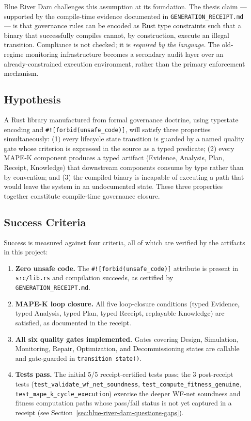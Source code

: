 Blue River Dam challenges this assumption at its foundation. The thesis
claim --- supported by the compile-time evidence documented in
\texttt{GENERATION\_RECEIPT.md} --- is that governance rules can be
encoded as Rust type constraints such that a binary that successfully compiles
cannot, by construction, execute an illegal transition. Compliance is not
checked; it is \emph{required by the language}. The old-regime monitoring
infrastructure becomes a secondary audit layer over an already-constrained
execution environment, rather than the primary enforcement mechanism.

\subsection{Hypothesis}
\label{sec:blue-river-dam-question-hypothesis}

A Rust library manufactured from formal governance doctrine, using typestate
encoding and \texttt{\#![forbid(unsafe\_code)]}, will satisfy three
properties simultaneously: (1) every lifecycle state transition is guarded
by a named quality gate whose criterion is expressed in the source as a
typed predicate; (2) every MAPE-K component produces a typed artifact
(Evidence, Analysis, Plan, Receipt, Knowledge) that downstream components
consume by type rather than by convention; and (3) the compiled binary is
incapable of executing a path that would leave the system in an undocumented
state. These three properties together constitute compile-time governance
closure.

\subsection{Success Criteria}
\label{sec:blue-river-dam-question-success}

Success is measured against four criteria, all of which are verified by the
artifacts in this project:

\begin{enumerate}
  \item \textbf{Zero unsafe code.} The \texttt{\#![forbid(unsafe\_code)]}
    attribute is present in \texttt{src/lib.rs} and compilation succeeds,
    as certified by \texttt{GENERATION\_RECEIPT.md}.
  \item \textbf{MAPE-K loop closure.} All five loop-closure conditions
    (typed Evidence, typed Analysis, typed Plan, typed Receipt, replayable
    Knowledge) are satisfied, as documented in the receipt.
  \item \textbf{All six quality gates implemented.} Gates covering Design,
    Simulation, Monitoring, Repair, Optimization, and Decommissioning states
    are callable and gate-guarded in \texttt{transition\_state()}.
  \item \textbf{Tests pass.} The initial 5/5 receipt-certified tests pass;
    the 3 post-receipt tests (\texttt{test\_validate\_wf\_net\_soundness},
    \texttt{test\_compute\_fitness\_genuine},
    \texttt{test\_mape\_k\_cycle\_execution}) exercise the deeper
    WF-net soundness and fitness computation paths whose pass/fail status
    is not yet captured in a receipt (see
    Section~\ref{sec:blue-river-dam-questions-gaps}).
\end{enumerate}
